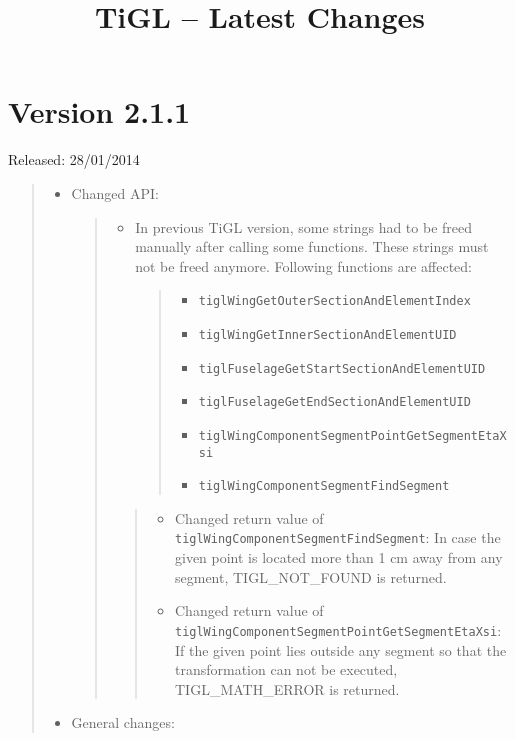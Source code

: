 \documentclass[]{scrartcl}
\author{}
\date{}
\begin{document}
\title{TiGL -- Latest Changes} \maketitle

\section{Version 2.1.1}\label{version-2.1.1}

Released: 28/01/2014

\begin{quote}
\begin{itemize}
\item
  Changed API:

  \begin{quote}
  \begin{itemize}
  \item
    In previous TiGL version, some strings had to be freed manually
    after calling some functions. These strings must not be freed
    anymore. Following functions are affected:

    \begin{quote}
    \begin{itemize}
    \itemsep1pt\parskip0pt
    \item
      \texttt{tiglWingGetOuterSectionAndElementIndex}
    \item
      \texttt{tiglWingGetInnerSectionAndElementUID}
    \item
      \texttt{tiglFuselageGetStartSectionAndElementUID}
    \item
      \texttt{tiglFuselageGetEndSectionAndElementUID}
    \item
      \texttt{tiglWingComponentSegmentPointGetSegmentEtaXsi}
    \item
      \texttt{tiglWingComponentSegmentFindSegment}
    \end{itemize}
    \end{quote}
  \end{itemize}

  \begin{quote}
  \begin{itemize}
  \itemsep1pt\parskip0pt
  \item
    Changed return value of
    \texttt{tiglWingComponentSegmentFindSegment}: In case the given
    point is located more than 1 cm away from any segment,
    TIGL\_NOT\_FOUND is returned.
  \item
    Changed return value of
    \texttt{tiglWingComponentSegmentPointGetSegmentEtaXsi}: If the given
    point lies outside any segment so that the transformation can not be
    executed, TIGL\_MATH\_ERROR is returned.
  \end{itemize}
  \end{quote}
  \end{quote}
\item
  General changes:


\end{itemize}
\end{quote}
\end{document}
